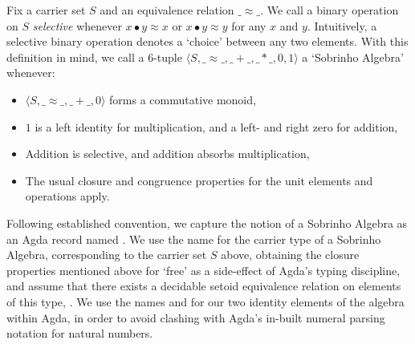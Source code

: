 Fix a carrier set $S$ and an equivalence relation $\_{≈}\_$.
We call a binary operation on $S$ \emph{selective} whenever $x \bullet y ≈ x$ or $x \bullet y ≈ y$ for any $x$ and $y$.
Intuitively, a selective binary operation denotes a `choice' between any two elements.
With this definition in mind, we call a 6-tuple $\langle S, \_{≈}\_, \_{+}\_, \_{*}\_, 0, 1 \rangle$ a `Sobrinho Algebra' whenever:
\begin{itemize}
\item
$\langle S, \_{≈}\_, \_{+}\_, 0 \rangle$ forms a commutative monoid,
\item
$1$ is a left identity for multiplication, and a left- and right zero for addition,
\item
Addition is selective, and addition absorbs multiplication,
\item
The usual closure and congruence properties for the unit elements and operations apply.
\end{itemize}


Following established convention, we capture the notion of a Sobrinho Algebra as an Agda record named .
We use the name  for the carrier type of a Sobrinho Algebra, corresponding to the carrier set $S$ above, obtaining the closure properties mentioned above for `free' as a side-effect of Agda's typing discipline, and assume that there exists a decidable setoid equivalence relation on elements of this type, .
We use the names  and  for our two identity elements of the algebra within Agda, in order to avoid clashing with Agda's in-built numeral parsing notation for natural numbers.
